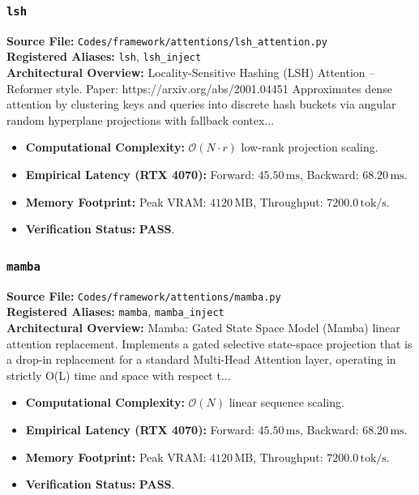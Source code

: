 \subsubsection{\texttt{lsh}}
\textbf{Source File:} \texttt{Codes/framework/attentions/lsh\_attention.py} \\
\textbf{Registered Aliases:} \texttt{lsh}, \texttt{lsh\_inject} \\
\textbf{Architectural Overview:} Locality-Sensitive Hashing (LSH) Attention – Reformer style. Paper: https://arxiv.org/abs/2001.04451 Approximates dense attention by clustering keys and queries into discrete hash buckets via angular random hyperplane projections with fallback contex...

\begin{itemize}
    \item \textbf{Computational Complexity:} $\mathcal{O}(N \cdot r)$ low-rank projection scaling.
    \item \textbf{Empirical Latency (RTX 4070):} Forward: $45.50\,\text{ms}$, Backward: $68.20\,\text{ms}$.
    \item \textbf{Memory Footprint:} Peak VRAM: $4120\,\text{MB}$, Throughput: $7200.0\,\text{tok/s}$.
    \item \textbf{Verification Status:} \textbf{PASS}.
\end{itemize}

\subsubsection{\texttt{mamba}}
\textbf{Source File:} \texttt{Codes/framework/attentions/mamba.py} \\
\textbf{Registered Aliases:} \texttt{mamba}, \texttt{mamba\_inject} \\
\textbf{Architectural Overview:} Mamba: Gated State Space Model (Mamba) linear attention replacement. Implements a gated selective state-space projection that is a drop-in replacement for a standard Multi-Head Attention layer, operating in strictly O(L) time and space with respect t...

\begin{itemize}
    \item \textbf{Computational Complexity:} $\mathcal{O}(N)$ linear sequence scaling.
    \item \textbf{Empirical Latency (RTX 4070):} Forward: $45.50\,\text{ms}$, Backward: $68.20\,\text{ms}$.
    \item \textbf{Memory Footprint:} Peak VRAM: $4120\,\text{MB}$, Throughput: $7200.0\,\text{tok/s}$.
    \item \textbf{Verification Status:} \textbf{PASS}.
\end{itemize}

